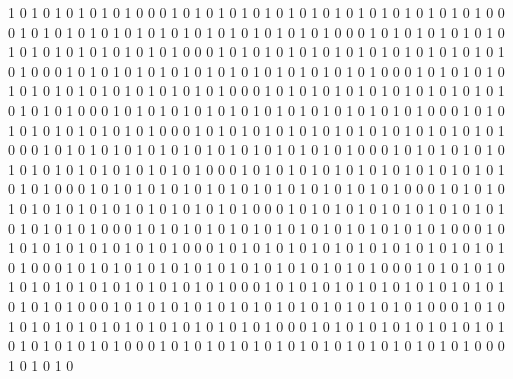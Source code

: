 1 0 1 0 1 0 1 0 1 0 1 0 0 0 1 0 1 0 1 0 1 0 1 0 1 0 1 0 1 0 1 0 1 0 1 0 1 0 1 0 1 0 0 0 1 0 1 0 1 0 1 0 1 0 1 0 1 0 1 0 1 0 1 0 1 0 1 0 1 0 1 0 0 0 1 0 1 0 1 0 1 0 1 0 1 0 1 0 1 0 1 0 1 0 1 0 1 0 1 0 1 0 0 0 1 0 1 0 1 0 1 0 1 0 1 0 1 0 1 0 1 0 1 0 1 0 1 0 1 0 1 0 0 0 1 0 1 0 1 0 1 0 1 0 1 0 1 0 1 0 1 0 1 0 1 0 1 0 1 0 1 0 0 0 1 0 1 0 1 0 1 0 1 0 1 0 1 0 1 0 1 0 1 0 1 0 1 0 1 0 1 0 0 0 1 0 1 0 1 0 1 0 1 0 1 0 1 0 1 0 1 0 1 0 1 0 1 0 1 0 1 0 0 0 1 0 1 0 1 0 1 0 1 0 1 0 1 0 1 0 1 0 1 0 1 0 1 0 1 0 1 0 0 0 1 0 1 0 1 0 
1 0 1 0 1 0 1 0 1 0 1 0 0 0 1 0 1 0 1 0 1 0 1 0 1 0 1 0 1 0 1 0 1 0 1 0 1 0 1 0 1 0 0 0 1 0 1 0 1 0 1 0 1 0 1 0 1 0 1 0 1 0 1 0 1 0 1 0 1 0 1 0 0 0 1 0 1 0 1 0 1 0 1 0 1 0 1 0 1 0 1 0 1 0 1 0 1 0 1 0 1 0 0 0 1 0 1 0 1 0 1 0 1 0 1 0 1 0 1 0 1 0 1 0 1 0 1 0 1 0 1 0 0 0 1 0 1 0 1 0 1 0 1 0 1 0 1 0 1 0 1 0 1 0 1 0 1 0 1 0 1 0 0 0 1 0 1 0 1 0 1 0 1 0 1 0 1 0 1 0 1 0 1 0 1 0 1 0 1 0 1 0 0 0 1 0 1 0 1 0 1 0 1 0 1 0 1 0 1 0 1 0 1 0 1 0 1 0 1 0 1 0 0 0 1 0 1 0 1 0 1 0 1 0 1 0 1 0 1 0 1 0 1 0 1 0 1 0 1 0 1 0 0 0 1 0 1 0 1 0 
1 0 1 0 1 0 1 0 1 0 1 0 0 0 1 0 1 0 1 0 1 0 1 0 1 0 1 0 1 0 1 0 1 0 1 0 1 0 1 0 1 0 0 0 1 0 1 0 1 0 1 0 1 0 1 0 1 0 1 0 1 0 1 0 1 0 1 0 1 0 1 0 0 0 1 0 1 0 1 0 1 0 1 0 1 0 1 0 1 0 1 0 1 0 1 0 1 0 1 0 1 0 0 0 1 0 1 0 1 0 1 0 1 0 1 0 1 0 1 0 1 0 1 0 1 0 1 0 1 0 1 0 0 0 1 0 1 0 1 0 1 0 1 0 1 0 1 0 1 0 1 0 1 0 1 0 1 0 1 0 1 0 0 0 1 0 1 0 1 0 1 0 1 0 1 0 1 0 1 0 1 0 1 0 1 0 1 0 1 0 1 0 0 0 1 0 1 0 1 0 1 0 1 0 1 0 1 0 1 0 1 0 1 0 1 0 1 0 1 0 1 0 0 0 1 0 1 0 1 0 1 0 1 0 1 0 1 0 1 0 1 0 1 0 1 0 1 0 1 0 1 0 0 0 1 0 1 0 1 0 
